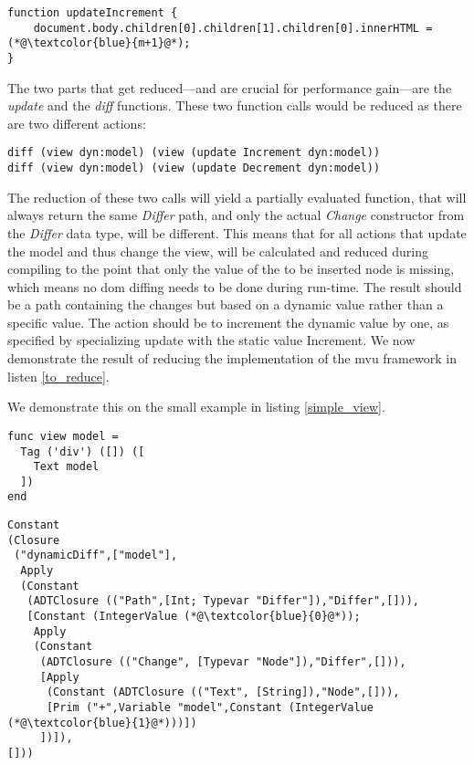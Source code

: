 \begin{lstlisting}[columns=fullflexible, label={dyn_javascript}, language=JaLi, caption=Eval the JavaScript string that patches the view]
function updateIncrement {
    document.body.children[0].children[1].children[0].innerHTML = (*@\textcolor{blue}{m+1}@*);
}
\end{lstlisting}

The two parts that get reduced---and are crucial for performance gain---are the \textit{update} and the \textit{diff} functions.
These two function calls would be reduced as there are two different actions:

\begin{lstlisting}[columns=fullflexible, label={diff-inc-dec}, language=Other, caption=Increment and Decrement diff calls]
diff (view dyn:model) (view (update Increment dyn:model))
diff (view dyn:model) (view (update Decrement dyn:model))
\end{lstlisting}

The reduction of these two calls will yield a partially evaluated function, that will always return the same \textit{Differ} path, and only the actual \textit{Change} constructor from the \textit{Differ} data type, will be different.
This means that for all actions that update the model and thus change the view, will be calculated and reduced during compiling to the point that only the value of the to be inserted node is missing, which means no \gls{dom} diffing needs to be done during run-time. The result should be a path containing the changes but based on a dynamic value rather than a specific value. The action should be to increment the dynamic value by one, as specified by specializing update with the static value Increment. 
We now demonstrate the result of reducing the implementation of the \gls{mvu} framework in listen \ref{to_reduce}.



We demonstrate this on the small example in listing \ref{simple_view}.

\begin{lstlisting}[columns=fullflexible, label={simple_view}, language=JaLi, caption={A minimal example of a DOM node}]
func view model =
  Tag ('div') ([]) ([
    Text model
  ])
end
\end{lstlisting}

\begin{lstlisting}[columns=fullflexible, label={reduced_diff}, language=Other, caption=Reduced result from calling diff with a dynamic model]
Constant
(Closure
 ("dynamicDiff",["model"],
  Apply
  (Constant
   (ADTClosure (("Path",[Int; Typevar "Differ"]),"Differ",[])),
   [Constant (IntegerValue (*@\textcolor{blue}{0}@*));
    Apply
    (Constant
     (ADTClosure (("Change", [Typevar "Node"]),"Differ",[])),
     [Apply
      (Constant (ADTClosure (("Text", [String]),"Node",[])),
      [Prim ("+",Variable "model",Constant (IntegerValue (*@\textcolor{blue}{1}@*)))])
     ])]),
[]))
\end{lstlisting}

